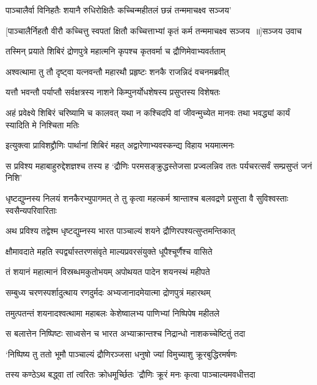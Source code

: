\twolineshloka
{पाञ्चालैर्वा विनिहतैः शयानै रुधिरोक्षितैः}
{कच्चिन्महीतलं छन्नं तन्ममाचक्ष्व सञ्जय'}


\threelineshloka
{[पाञ्चालैर्निहतौ वीरौ कच्चित्तु स्वपतां क्षितौ}
{कच्चित्ताभ्यां कृतं कर्म तन्ममाचक्ष्व सञ्जय ॥]सञ्जय उवाच}
{}


\twolineshloka
{तस्मिन् प्रयाते शिबिरं द्रोणपुत्रे महात्मनि}
{कृपश्च कृतवर्मा च द्रौणिमेवाभ्यवर्तताम्}


\twolineshloka
{अश्वत्थामा तु तौ दृष्ट्वा यत्नवन्तौ महारथौ}
{प्रहृष्टः शनकै राजन्निदं वचनमब्रवीत्}


\twolineshloka
{यत्तौ भवन्तौ पर्याप्तौ सर्वक्षत्रस्य नाशने}
{किम्पुनर्योधशेषस्य प्रसुप्तस्य विशेषतः}


\threelineshloka
{अहं प्रवेक्ष्ये शिबिरं चरिष्यामि च कालवत्}
{यथा न कश्चिदपि वां जीवन्मुच्येत मानवः}
{तथा भवद्ध्यां कार्यं स्यादिति मे निश्चिता मतिः}


\twolineshloka
{इत्युक्त्वा प्राविशद्द्रौणिः पार्थानां शिबिरं महत्}
{अद्वारेणाभ्यवस्कन्द्य विहाय भयमात्मनः}


\threelineshloka
{स प्रविश्य महाबाहुरुद्देशज्ञश्च तस्य ह}
{`द्रौणिः परमसङ्क्रुद्धस्तेजसा प्रज्वलन्निव}
{ततः पर्यचरत्सर्वं सम्प्रसुप्तं जनं निशि'}


धृष्टद्युम्नस्य निलयं शनकैरभ्युपागमत्
\twolineshloka
{ते तु कृत्वा महत्कर्म श्रान्ताश्च बलवद्रणे}
{प्रसुप्ता वै सुविश्वस्ताः स्वसैन्यपरिवारिताः}


\twolineshloka
{अथ प्रविश्य तद्वेश्म धृष्टद्युम्नस्य भारत}
{पाञ्चाल्यं शयने द्रौणिरपश्यत्सुप्तमन्तिकात्}


\twolineshloka
{क्षौमावदाते महति स्पर्द्व्यास्तरणसंवृते}
{माल्यप्रवरसंयुक्ते धूपैश्चूर्णैश्च वासिते}


\twolineshloka
{तं शयानं महात्मानं विस्रब्धमकुतोभयम्}
{अपोथयत पादेन शयनस्थं महीपते}


\twolineshloka
{सम्बुध्य चरणस्पर्शादुत्थाय रणदुर्मदः}
{अभ्यजानादमेयात्मा द्रोणपुत्रं महारथम्}


\twolineshloka
{तमुत्पतन्तं शयनादश्वत्थामा महाबलः}
{केशेष्वालभ्य पाणिभ्यां निष्पिपेष महीतले}


\twolineshloka
{स बलात्तेन निष्पिष्टः साध्वसेन च भारत}
{अभ्याक्रान्तश्च निद्रान्धो नाशकच्चेष्टितुं तदा}


\twolineshloka
{`निष्पिष्य तु ततो भूमौ पाञ्चाल्यं द्रौणिरञ्जसा}
{धनुषो ज्यां विमुच्याशु क्रूरबुद्धिरमर्षणः}


\twolineshloka
{तस्य कण्ठेऽथ बद्ध्वा तां त्वरितः क्रोधमूर्च्छितः}
{'द्रौणिः क्रूरं मनः कृत्वा पाञ्चाल्यमवधीत्तदा}


